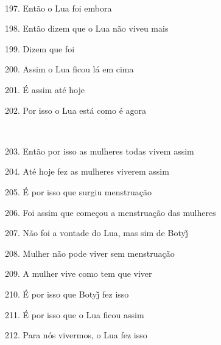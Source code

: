 ~

197. Então o Lua foi embora

198. Então dizem que o Lua não viveu mais

199. Dizem que foi

200. Assim o Lua ficou lá em cima

201. É assim até hoje

202. Por isso o Lua está como é agora

~

203. Então por isso as mulheres todas vivem assim

204. Até hoje fez as mulheres viverem assim

205. É por isso que surgiu menstruação

206. Foi assim que começou a menstruação das mulheres

207. Não foi a vontade do Lua, mas sim de Botyj̃

208. Mulher não pode viver sem menstruação

209. A mulher vive como tem que viver

210. É por isso que Botyj̃ fez isso

211. É por isso que o Lua ficou assim

212. Para nós vivermos, o Lua fez isso